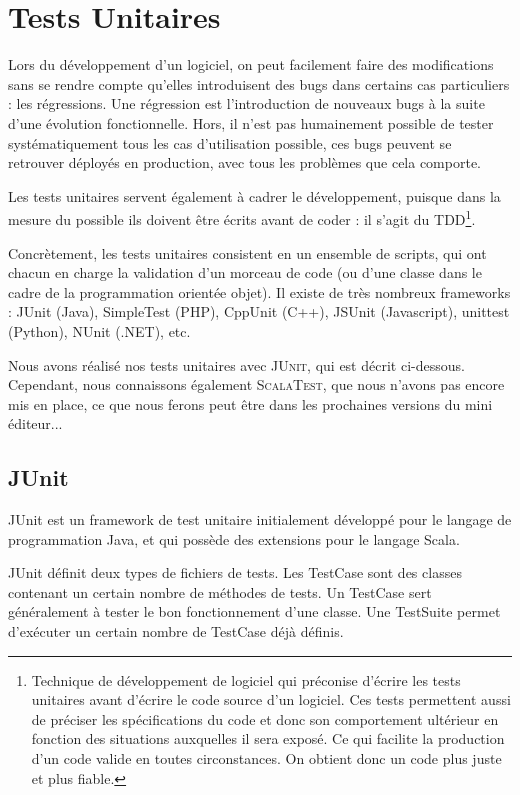 \documentclass[a4paper,11pt]{article}
\begin{document}
\section{Tests Unitaires}

Lors du développement d'un logiciel, on peut facilement faire des modifications sans se rendre compte qu'elles introduisent des bugs dans certains cas particuliers : les régressions. Une régression est l'introduction de nouveaux bugs à la suite d'une évolution fonctionnelle. Hors, il n'est pas humainement possible de tester systématiquement tous les cas d'utilisation possible, ces bugs peuvent se retrouver déployés en production, avec tous les problèmes que cela comporte.

Les tests unitaires servent également à cadrer le développement, puisque dans la mesure du possible ils doivent être écrits avant de coder : il s'agit du TDD\footnote{Technique de développement de logiciel qui préconise d'écrire les tests unitaires avant d'écrire le code source d'un logiciel. Ces tests permettent aussi de préciser les spécifications du code et donc son comportement ultérieur en fonction des situations auxquelles il sera exposé. Ce qui facilite la production d'un code valide en toutes circonstances. On obtient donc un code plus juste et plus fiable.}.

Concrètement, les tests unitaires consistent en un ensemble de scripts, qui ont chacun en charge la validation d'un morceau de code (ou d'une classe dans le cadre de la programmation orientée objet). Il existe de très nombreux frameworks : JUnit (Java), SimpleTest (PHP), CppUnit (C++), JSUnit (Javascript), unittest (Python), NUnit (.NET), etc.

Nous avons réalisé nos tests unitaires avec \textsc{JUnit}, qui est décrit ci-dessous. Cependant, nous connaissons également \textsc{ScalaTest}, que nous n'avons pas encore mis en place, ce que nous ferons peut être dans les prochaines versions du mini éditeur...

\subsection{JUnit}

JUnit est un framework de test unitaire initialement développé pour le langage de programmation Java, et qui possède des extensions pour le langage Scala.

JUnit définit deux types de fichiers de tests. Les TestCase sont des classes contenant un certain nombre de méthodes de tests. Un TestCase sert généralement à tester le bon fonctionnement d'une classe. Une TestSuite permet d'exécuter un certain nombre de TestCase déjà définis.
\end{document}
